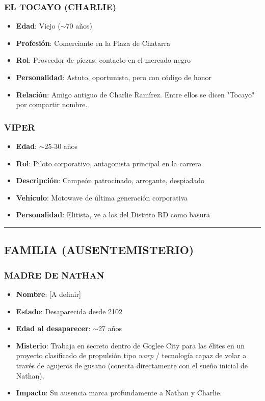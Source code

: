 \documentclass[11pt,a4paper]{report}
\begin{document}
\subsubsection{EL TOCAYO (CHARLIE)}
\begin{itemize}
  \item \textbf{Edad}: Viejo ($\sim$70 años)
  \item \textbf{Profesión}: Comerciante en la Plaza de Chatarra
  \item \textbf{Rol}: Proveedor de piezas, contacto en el mercado negro
  \item \textbf{Personalidad}: Astuto, oportunista, pero con código de honor
  \item \textbf{Relación}: Amigo antiguo de Charlie Ramírez. Entre ellos se dicen "Tocayo" por compartir nombre.

\end{itemize}
\subsubsection{VIPER}
\begin{itemize}
  \item \textbf{Edad}: $\sim$25-30 años
  \item \textbf{Rol}: Piloto corporativo, antagonista principal en la carrera
  \item \textbf{Descripción}: Campeón patrocinado, arrogante, despiadado
  \item \textbf{Vehículo}: Motowave de última generación corporativa
  \item \textbf{Personalidad}: Elitista, ve a los del Distrito RD como basura

\end{itemize}
\bigskip\hrule\bigskip

\subsection{FAMILIA (AUSENTEMISTERIO)}

\subsubsection{MADRE DE NATHAN}
\begin{itemize}
  \item \textbf{Nombre}: [A definir]
  \item \textbf{Estado}: Desaparecida desde 2102
  \item \textbf{Edad al desaparecer}: $\sim$27 años
  \item \textbf{Misterio}: Trabaja en secreto dentro de Goglee City para las élites en un proyecto clasificado de propulsión tipo \textit{warp} / tecnología capaz de volar a través de agujeros de gusano (conecta directamente con el sueño inicial de Nathan).
  \item \textbf{Impacto}: Su ausencia marca profundamente a Nathan y Charlie.

\end{itemize}
\end{document}
